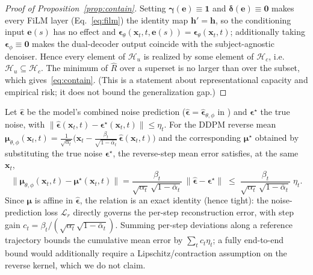 \begin{proof}[Proof of Proposition~\ref{prop:contain}]
Setting $\boldsymbol{\gamma}(\mathbf{e})\equiv\mathbf{1}$ and
$\boldsymbol{\delta}(\mathbf{e})\equiv\mathbf{0}$ makes every FiLM layer
(Eq.~\eqref{eq:film}) the identity map $\mathbf{h}'=\mathbf{h}$, so the
conditioning input $\mathbf{e}(s)$ has no effect and
$\boldsymbol{\epsilon}_\theta(\mathbf{x}_t,t,\mathbf{e}(s))=\boldsymbol{\epsilon}_\theta(\mathbf{x}_t,t)$;
additionally taking $\boldsymbol{\epsilon}_\phi\equiv\mathbf{0}$ makes the
dual-decoder output coincide with the subject-agnostic denoiser. Hence every
element of $\mathcal{H}_u$ is realized by some element of $\mathcal{H}_c$, i.e.
$\mathcal{H}_u\subseteq\mathcal{H}_c$. The minimum of $\widehat{R}$ over a
superset is no larger than over the subset, which gives~\eqref{eq:contain}. (This
is a statement about representational capacity and empirical risk; it does not
bound the generalization gap.)
\end{proof}

\begin{proposition}
\label{prop:prop}
Let $\widehat{\boldsymbol{\epsilon}}$ be the model's combined noise prediction
($\widehat{\boldsymbol{\epsilon}}=\widehat{\boldsymbol{\epsilon}}_{\theta,\phi}$
in \saddpm{}) and $\boldsymbol{\epsilon}^\star$ the true noise, with
$\|\widehat{\boldsymbol{\epsilon}}(\mathbf{x}_t,t)-\boldsymbol{\epsilon}^\star(\mathbf{x}_t,t)\|\le\eta_t$.
For the DDPM reverse mean
$\boldsymbol{\mu}_{\theta,\phi}(\mathbf{x}_t,t)=\tfrac{1}{\sqrt{\alpha_t}}\big(\mathbf{x}_t-\tfrac{\beta_t}{\sqrt{1-\bar{\alpha}_t}}\,\widehat{\boldsymbol{\epsilon}}(\mathbf{x}_t,t)\big)$
and the corresponding $\boldsymbol{\mu}^\star$ obtained by substituting the true
noise $\boldsymbol{\epsilon}^\star$, the reverse-step mean error satisfies, at the
same $\mathbf{x}_t$,
\begin{equation}
  \big\|\boldsymbol{\mu}_{\theta,\phi}(\mathbf{x}_t,t)-\boldsymbol{\mu}^\star(\mathbf{x}_t,t)\big\|
  =\frac{\beta_t}{\sqrt{\alpha_t}\,\sqrt{1-\bar{\alpha}_t}}\,\big\|\widehat{\boldsymbol{\epsilon}}-\boldsymbol{\epsilon}^\star\big\|
  \;\le\;\frac{\beta_t}{\sqrt{\alpha_t}\,\sqrt{1-\bar{\alpha}_t}}\;\eta_t.
  \label{eq:prop}
\end{equation}
Since $\boldsymbol{\mu}$ is affine in $\widehat{\boldsymbol{\epsilon}}$, the
relation is an exact identity (hence tight): the noise-prediction loss
$\mathcal{L}_r$ directly governs the per-step reconstruction error, with step gain
$c_t=\beta_t/(\sqrt{\alpha_t}\sqrt{1-\bar{\alpha}_t})$. Summing per-step deviations
along a reference trajectory bounds the cumulative mean error by
$\sum_t c_t\eta_t$; a fully end-to-end bound would additionally require a
Lipschitz/contraction assumption on the reverse kernel, which we do not claim.
\end{proposition}

